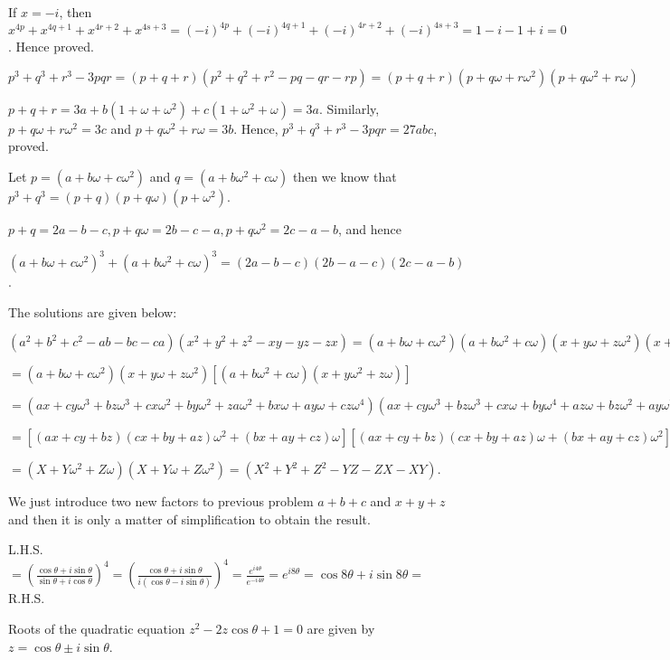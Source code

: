  If $x = -i$, then $x^{4p} + x^{4q + 1} + x^{4r + 2} + x^{4s + 3} = (-i)^{4p} + (-i)^{4q + 1} + (-i)^{4r +
    2} + (-i)^{4s + 3} = 1 - i - 1 + i = 0$. Hence proved.
\item $p^3 + q^3 + r^3 - 3pqr = (p + q + r)(p^2 + q^2 + r^2 - pq - qr - rp) = (p + q + r)(p + q\omega +
  r\omega^2)(p + q\omega^2 + r\omega)$

  $p + q + r = 3a + b(1 + \omega + \omega^2) + c(1 + \omega^2 + \omega) = 3a$. Similarly, $p + q\omega +
  r\omega^2 = 3c$ and $p + q\omega^2 + r\omega = 3b$. Hence, $p^3 + q^3 + r^3 - 3pqr = 27abc$, proved.
\item Let $p = (a + b\omega + c\omega^2)$ and $q = (a + b\omega^2 + c\omega)$ then we know that $p^3 + q^3 =
  (p + q)(p + q\omega)(p + \omega^2)$.

  $p + q = 2a - b - c, p + q\omega = 2b - c - a, p + q\omega^2 = 2c - a - b$, and hence

  $(a + b\omega + c\omega^2)^3 + (a + b\omega^2 + c\omega)^3 = (2a - b - c)(2b - a - c)(2c - a - b)$.
\item The solutions are given below:
  \startitemize[i]
  \item $(a^2 + b^2 + c^2 - ab - bc - ca)(x^2 + y^2 + z^2 - xy - yz - zx) = (a + b\omega + c\omega^2)(a +
    b\omega^2 + c\omega)(x + y\omega + z\omega^2)(x + y\omega^2 + z\omega)$

    $= (a + b\omega + c\omega^2)(x + y\omega + z\omega^2)[(a + b\omega^2 + c\omega)(x + y\omega^2 +
      z\omega)]$

    $= (ax + cy\omega^3 + bz\omega^3 + cx\omega^2 + by\omega^2 + za\omega^2 + bx\omega + ay\omega +
    cz\omega^4)(ax + cy\omega^3 + bz\omega^3 + cx\omega + by\omega^4 + az\omega + bz\omega^2 + ay\omega^2
    + cz\omega^2)$

    $= [(ax+cy+bz)(cx+by+az)\omega^2 + (bx+ay+cz)\omega][(ax+cy+bz)(cx+by+az)\omega + (bx+ay+cz)\omega^2]$

    $= (X+Y\omega^2+Z\omega)(X+Y\omega+Z\omega^2) = (X^2+Y^2+Z^2
    -YZ-ZX-XY)$.
  \item We just introduce two new factors to previous problem $a + b + c$ and $x + y + z$ and then it is
    only a matter of simplification to obtain the result.
  \stopitemize
\item L.H.S. $= \left(\frac{\cos\theta + i\sin\theta}{\sin\theta + i\cos\theta}\right)^4 =
  \left(\frac{\cos\theta + i\sin\theta}{i(\cos\theta - i\sin\theta)}\right)^4 =
  \frac{e^{i4\theta}}{e^{-i4\theta}} = e^{i8\theta} = \cos8\theta + i\sin8\theta =$ R.H.S.
\item Roots of the quadratic equation $z^2 - 2z\cos\theta + 1 = 0$ are given by $z = \cos\theta\pm
  i\sin\theta$.

